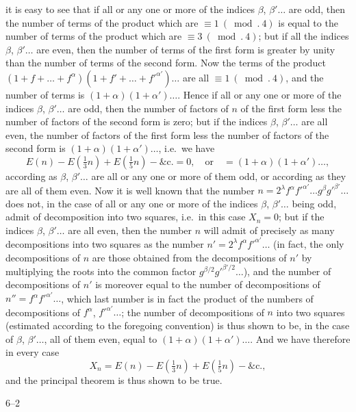 \documentclass[11pt]{article}
\begin{document}
\noindent it is easy to see that if all or any one or more of the indices $\beta$, $\beta'\ldots$ are odd, then
the number of terms of the product which are $\equiv 1\ (\bmod.\ 4)$ is equal to the number
of terms of the product which are $\equiv 3\ (\bmod.\ 4)$; but if all the indices $\beta$, $\beta'\ldots$ are
even, then the number of terms of the first form is greater by unity than the number of
terms of the second form. Now the terms of the product $(1 + f + \ldots + f^{\alpha})(1 + f' + \ldots + f'^{\alpha'})\ldots$
are all $\equiv 1\ (\bmod.\ 4)$, and the number of terms is $(1 + \alpha)(1 + \alpha')\ldots$. Hence if all or
any one or more of the indices $\beta$, $\beta'\ldots$ are odd, then the number of factors of $n$ of
the first form less the number of factors of the second form is zero; but if the
indices $\beta$, $\beta'\ldots$ are all even, the number of factors of the first form less the number
of factors of the second form is $(1 + \alpha)(1 + \alpha')\ldots$, i.e.\ we have
\[
E(n) - E(\tfrac{1}{3} n) + E(\tfrac{1}{5} n) - \&\text{c.} = 0,\quad\text{or}\quad = (1 + \alpha)(1 + \alpha')\ldots,
\]
according as $\beta$, $\beta'\ldots$ are all or any one or more of them odd, or according as they are
all of them even. Now it is well known that the number $n = 2^{\lambda}f^{\alpha}f'^{\alpha'}\ldots g^{\beta}g'^{\beta'}\ldots$ does
not, in the case of all or any one or more of the indices $\beta$, $\beta'\ldots$ being odd, admit
of decomposition into two squares, i.e.\ in this case $X_{n} = 0$; but if the indices $\beta$, $\beta'\ldots$
are all even, then the number $n$ will admit of precisely as many decompositions into
two squares as the number $n' = 2^{\lambda}f^{\alpha}f'^{\alpha'}\ldots$ (in fact, the only decompositions of $n$ are
those obtained from the decompositions of $n'$ by multiplying the roots into the common
factor $g^{\beta/2}g'^{\beta'/2}\ldots$), and the number of decompositions of $n'$ is moreover equal to the
number of decompositions of $n'' = f^{\alpha}f'^{\alpha'}\ldots$, which last number is in fact the product of
the numbers of decompositions of $f^{\alpha}$, $f'^{\alpha'}\ldots$; the number of decompositions of $n$ into two
squares (estimated according to the foregoing convention) is thus shown to be, in the
case of $\beta$, $\beta'\ldots$, all of them even, equal to $(1 + \alpha)(1 + \alpha')\ldots$. And we have therefore in
every case
\[
X_{n} = E(n) - E(\tfrac{1}{3} n) + E(\tfrac{1}{5} n) - \&\text{c.},
\]
and the principal theorem is thus shown to be true.

\begin{flushright}\small 6--2\end{flushright}
\end{document}

